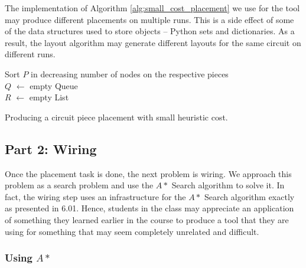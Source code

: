 The implementation of Algorithm \ref{alg:small_cost_placement} we use for the
tool may produce different placements on multiple runs. This is a side
effect of some of the data structures used to store objects -- Python sets and
dictionaries. As a result, the layout algorithm may generate different layouts
for the same circuit on different runs.

\begin{algorithm}
\BlankLine
Sort $P$ in decreasing number of nodes on the respective pieces\\
$Q$ $\leftarrow$ empty Queue\\
$R$ $\leftarrow$ empty List\\
\caption{Producing a circuit piece placement with small heuristic cost.}
\label{alg:small_cost_placement}
\end{algorithm}

\subsection{Part 2: Wiring}

Once the placement task is done, the next problem is wiring.
We approach this problem as a search problem and use the $A*$ Search algorithm to
solve it. In fact, the wiring step uses an infrastructure for the $A*$ Search
algorithm exactly as presented in 6.01. Hence, students in
the class may appreciate an application of something they learned
earlier in the course to produce a tool that they are using for something that
may seem completely unrelated and difficult.

\subsubsection{Using $A*$}

